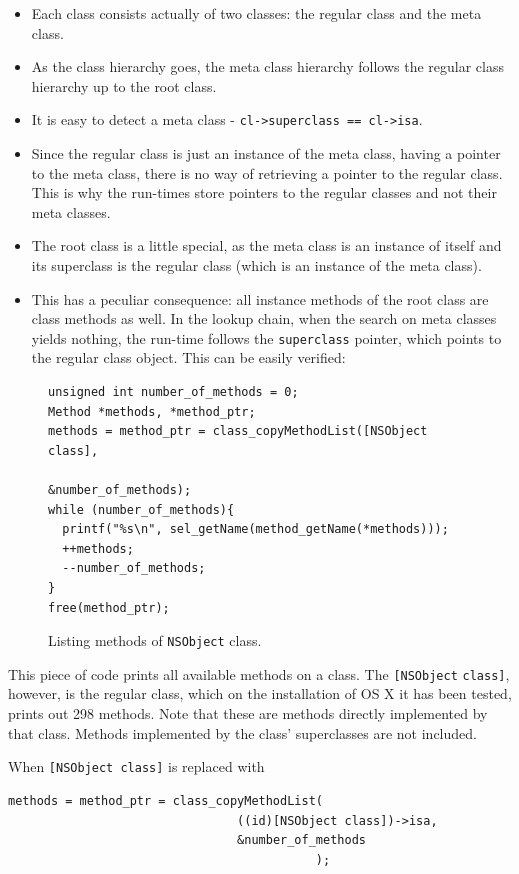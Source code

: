 \begin{itemize}
\item Each class consists actually of two classes: the regular class and the meta class.
\item As the class hierarchy goes, the meta class hierarchy follows the regular class hierarchy up to the root class.
\item It is easy to detect a meta class - \verb:cl->superclass == cl->isa:.
\item Since the regular class is just an instance of the meta class, having a pointer to the meta class, there is no way of retrieving a pointer to the regular class. This is why the run-times store pointers to the regular classes and not their meta classes.
\item The root class is a little special, as the meta class is an instance of itself and its superclass is the regular class (which is an instance of the meta class).
\item This has a peculiar consequence: all instance methods of the root class are class methods as well. In the lookup chain, when the search on meta classes yields nothing, the run-time follows the \verb=superclass= pointer, which points to the regular class object. This can be easily verified:
\end{itemize}

\begin{figure}[H]
\begin{verbatim}
unsigned int number_of_methods = 0;
Method *methods, *method_ptr;
methods = method_ptr = class_copyMethodList([NSObject class], 
                                            &number_of_methods);
while (number_of_methods){
  printf("%s\n", sel_getName(method_getName(*methods)));
  ++methods;
  --number_of_methods;
}
free(method_ptr);
\end{verbatim}
  \centering{}
  \caption{Listing methods of \texttt{NSObject} class.}
  \label{fig:listing_NSObject_methods}
\end{figure}

This piece of code prints all available methods on a class. The \verb=[NSObject= \verb=class]=, however, is the regular class, which on the installation of OS X it has been tested, prints out 298 methods. Note that these are methods directly implemented by that class. Methods implemented by the class' superclasses are not included.

When \verb=[NSObject class]= is replaced with

\begin{verbatim}
methods = method_ptr = class_copyMethodList(
                                ((id)[NSObject class])->isa, 
                                &number_of_methods
                                           );
\end{verbatim}

